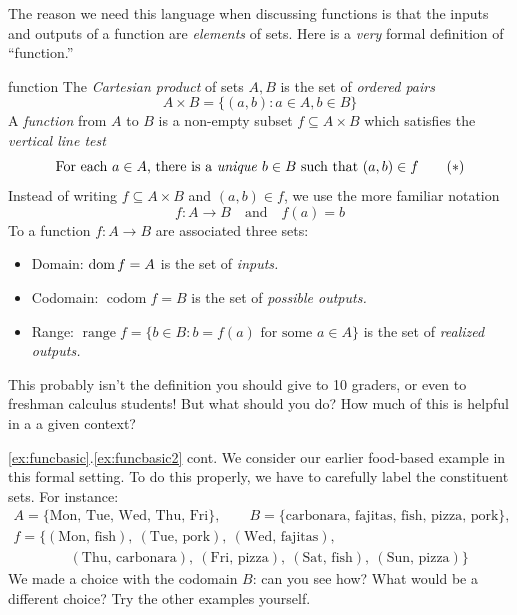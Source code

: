\bigskip


The reason we need this language when discussing functions is that the inputs and outputs of a function are \emph{elements} of sets. Here is a \emph{very} formal definition of ``function.''

\begin{defn}{}{function}
	The \emph{Cartesian product} of sets $A,B$ is the set of \emph{ordered pairs}
	\[
		A\times B=\bigl\{(a,b):a\in A,b\in B\bigr\}
	\]
	A \emph{function} from $A$ to $B$ is a non-empty subset $f\subseteq A\times B$ which satisfies the \emph{vertical line test}
	\[
		\text{For each $a\in A$, there is a \emph{unique} $b\in B$ such that $(a,b)\in f$} \tag{$\ast$}
	\]
	Instead of writing $f\subseteq A\times B$ and $(a,b)\in f$, we use the more familiar notation
	\[
		f:A\to B\quad\text{and}\quad f(a)=b
	\]
	To a function $f:A\to B$ are associated three sets:%
	\begin{itemize}\itemsep0pt
	  \item Domain: $\operatorname{dom} f=A$ is the set of \emph{inputs.}
	  \item Codomain: $\operatorname{codom} f=B$ is the set of \emph{possible outputs.}
	  \item Range: $\operatorname{range} f=\{b\in B:b=f(a)\text{ for some }a\in A\}$ is the set of \emph{realized outputs.}
	\end{itemize}
\end{defn}




This probably isn't the definition you should give to 10\th{} graders, or even to freshman calculus students! But what should you do? How much of this is helpful in a a given context?

\goodbreak


\begin{example*}{\ref{ex:funcbasic}.\ref{ex:funcbasic2} cont.}{}
	We consider our earlier food-based example in this formal setting. To do this properly, we have to carefully label the constituent sets. For instance:
	\begin{gather*}
		A=\bigl\{\text{Mon, Tue, Wed, Thu, Fri}\bigr\},\qquad B=\bigl\{\text{carbonara, fajitas, fish, pizza, pork}\bigr\},\\[5pt]
		f=\bigl\{(\text{Mon,\ fish}),\ (\text{Tue,\ pork}),\ (\text{Wed,\ fajitas}),\\
		\qquad\qquad (\text{Thu,\ carbonara}),\ (\text{Fri,\ pizza}),\ (\text{Sat,\ fish}),\ (\text{Sun,\ pizza})\bigr\}
	\end{gather*}
	We made a choice with the codomain $B$: can you see how? What would be a different choice?\smallbreak
	Try the other examples yourself.
\end{example*}


